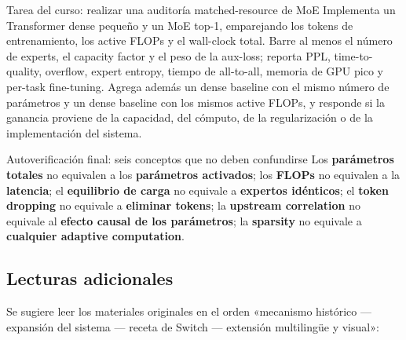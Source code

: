 \documentclass[a4paper]{article}
\begin{document}
\begin{importantbox}{Tarea del curso: realizar una auditoría matched-resource de MoE}
Implementa un Transformer dense pequeño y un MoE top-1, emparejando los tokens de entrenamiento, los active FLOPs y el wall-clock total. Barre al menos el número de experts, el capacity factor y el peso de la aux-loss; reporta PPL, time-to-quality, overflow, expert entropy, tiempo de all-to-all, memoria de GPU pico y per-task fine-tuning. Agrega además un dense baseline con el mismo número de parámetros y un dense baseline con los mismos active FLOPs, y responde si la ganancia proviene de la capacidad, del cómputo, de la regularización o de la implementación del sistema.
\end{importantbox}

\begin{warningbox}{Autoverificación final: seis conceptos que no deben confundirse}
Los \textbf{parámetros totales} no equivalen a los \textbf{parámetros activados}; los \textbf{FLOPs} no equivalen a la \textbf{latencia}; el \textbf{equilibrio de carga} no equivale a \textbf{expertos idénticos}; el \textbf{token dropping} no equivale a \textbf{eliminar tokens}; la \textbf{upstream correlation} no equivale al \textbf{efecto causal de los parámetros}; la \textbf{sparsity} no equivale a \textbf{cualquier adaptive computation}.
\end{warningbox}

\subsection{Lecturas adicionales}

Se sugiere leer los materiales originales en el orden «mecanismo histórico — expansión del sistema — receta de Switch — extensión multilingüe y visual»:
\end{document}
